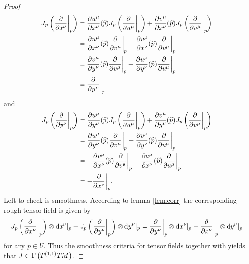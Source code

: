 \begin{proof}
\begin{align*}
J_p\del[3]{\frac{\partial}{\partial x^\nu}\bigg\vert_p} &= \frac{\partial u^\mu}{\partial x^\nu}(\widehat{p})J_p\del[3]{\frac{\partial}{\partial u^\mu}\bigg\vert_p} + \frac{\partial v^\mu}{\partial x^\nu}(\widehat{p})J_p\del[3]{\frac{\partial}{\partial v^\mu}\bigg\vert_p}\\
&= \frac{\partial u^\mu}{\partial x^\nu}(\widehat{p})\frac{\partial}{\partial v^\mu}\bigg\vert_p - \frac{\partial v^\mu}{\partial x^\nu}(\widehat{p})\frac{\partial}{\partial u^\mu}\bigg\vert_p\\
&= \frac{\partial v^\mu}{\partial y^\nu}(\widehat{p})\frac{\partial}{\partial v^\mu}\bigg\vert_p + \frac{\partial u^\mu}{\partial y^\nu}(\widehat{p})\frac{\partial}{\partial u^\mu}\bigg\vert_p\\
&= \frac{\partial}{\partial y^\nu}\bigg\vert_p
\end{align*}
\noindent and
\begin{align*}
J_p\del[3]{\frac{\partial}{\partial y^\nu}\bigg\vert_p} &= \frac{\partial u^\mu}{\partial y^\nu}(\widehat{p})J_p\del[3]{\frac{\partial}{\partial u^\mu}\bigg\vert_p} + \frac{\partial v^\mu}{\partial y^\nu}(\widehat{p})J_p\del[3]{\frac{\partial}{\partial v^\mu}\bigg\vert_p}\\
&= \frac{\partial u^\mu}{\partial y^\nu}(\widehat{p})\frac{\partial}{\partial v^\mu}\bigg\vert_p - \frac{\partial v^\mu}{\partial y^\nu}(\widehat{p})\frac{\partial}{\partial u^\mu}\bigg\vert_p\\
&= -\frac{\partial v^\mu}{\partial x^\nu}(\widehat{p})\frac{\partial}{\partial v^\mu}\bigg\vert_p - \frac{\partial u^\mu}{\partial x^\nu}(\widehat{p})\frac{\partial}{\partial u^\mu}\bigg\vert_p\\
&= -\frac{\partial}{\partial x^\nu}\bigg\vert_p.
\end{align*}
Left to check is smoothness. According to lemma \ref{lem:corr} the corresponding rough tensor field is given by
\begin{equation*}
J_p\del[3]{\frac{\partial}{\partial x^\nu}\bigg\vert_p} \otimes \d x^\nu\vert_p + J_p\del[3]{\frac{\partial}{\partial y^\nu}\bigg\vert_p} \otimes \d y^\nu\vert_p = \frac{\partial}{\partial y^\nu}\bigg\vert_p \otimes \d x^\nu\vert_p - \frac{\partial}{\partial x^\nu}\bigg\vert_p \otimes \d y^\nu\vert_p
\end{equation*}
\noindent for any $p \in U$. Thus the smoothness criteria for tensor fields \cite[317--318]{lee:smooth_manifolds:2013} together with \cite[36]{lee:smooth_manifolds:2013} yields that $J \in \Gamma\del[1]{T^{(1,1)}TM}$.
\end{proof}
\printbibliography

